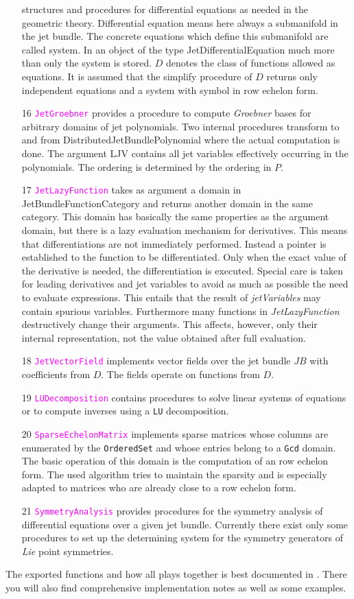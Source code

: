 \documentclass[12pt,a4paper]{article}
\newcommand{\spadfun}[1]{\textcolor{magenta}{\tt #1}}
\begin{document}
\begin{itemize}
structures and procedures for differential equations as needed in the 
geometric theory. Differential equation means here always a submanifold 
in the jet bundle. The concrete equations which define this submanifold 
are called system. In an object of the type JetDifferentialEquation much 
more than only the system is stored. $D$ denotes the class of functions 
allowed as equations. It is assumed that the simplify procedure of $D$ 
returns only independent equations and a system with symbol in row 
echelon form.
%
\item[16] \spadfun{JetGroebner} provides a procedure to compute 
{\em Groebner} bases for arbitrary domains of jet polynomials. 
Two internal procedures transform to and from 
DistributedJetBundlePolynomial where the actual computation is done. 
The argument LJV contains all jet variables effectively occurring in 
the polynomials. The ordering is determined by the ordering in $P$.
%
\item[17] \spadfun{JetLazyFunction} takes as argument a domain in 
JetBundleFunctionCategory and returns another domain in the same 
category. This domain has basically the same properties as the argument 
domain, but there is a lazy evaluation mechanism for derivatives. 
This means that differentiations are not immediately performed. 
Instead a pointer is established to the function to be differentiated. 
Only when the exact value of the derivative is needed, the differentiation 
is executed. Special care is taken for leading derivatives and jet 
variables to avoid as much as possible the need to evaluate expressions. 
This entails that the result of {\em jetVariables} may contain spurious 
variables. 
Furthermore many functions in {\em JetLazyFunction} destructively change 
their arguments. This affects, however, only their internal representation, 
not the value obtained after full evaluation.
%
\item[18] \spadfun{JetVectorField} implements vector fields over the 
jet bundle $JB$ with coefficients from $D$. The fields operate on functions 
from $D$.
%
\item[19] \spadfun{LUDecomposition} contains procedures to solve linear 
systems of equations or to compute inverses using a {\tt LU} decomposition.
%
\item[20] \spadfun{SparseEchelonMatrix} implements sparse matrices whose 
columns are enumerated by the {\tt OrderedSet} and whose entries belong 
to a {\tt Gcd} domain. The basic operation of this domain is the computation
of an row echelon form. The used algorithm tries to maintain the sparsity 
and is especially adapted to matrices who are already close to a row 
echelon form.
%
\item[21] \spadfun{SymmetryAnalysis} provides procedures for the symmetry 
analysis of differential equations over a given jet bundle. 
Currently there exist only some procedures to set up the determining 
system for the symmetry generators of {\em Lie} point symmetries.
\end{itemize}
The exported functions and how all plays together is best documented
in \cite{wms:axiom}. There you will also find comprehensive 
implementation notes as well as some examples.
\end{document}
